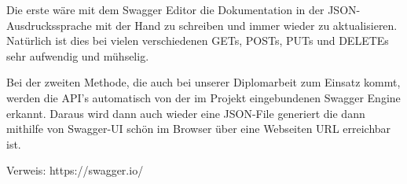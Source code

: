 Die erste wäre mit dem Swagger Editor die Dokumentation in der JSON-Ausdruckssprache mit der Hand zu schreiben und immer wieder zu aktualisieren. Natürlich ist dies bei vielen verschiedenen GETs, POSTs, PUTs und DELETEs sehr aufwendig und mühselig.

Bei der zweiten Methode, die auch bei unserer Diplomarbeit zum Einsatz kommt, werden die API's automatisch von der im Projekt eingebundenen Swagger Engine erkannt. Daraus wird dann auch wieder eine JSON-File generiert die dann mithilfe von Swagger-UI schön im Browser über eine Webseiten URL erreichbar ist.


Verweis: https://swagger.io/